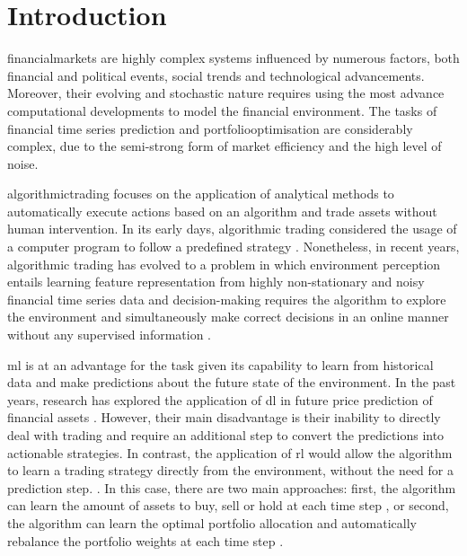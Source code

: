 \chapter{Introduction} \label{ch:introduction}

\Gls{financialmarkets} are highly complex systems influenced by numerous factors, both financial and political events, social trends and technological advancements. Moreover, their evolving and stochastic nature requires using the most advance computational developments to model the financial environment. The tasks of financial time series prediction and \Gls{portfoliooptimisation} are considerably complex, due to the semi-strong form of market efficiency and the high level of noise. \cite{Shen2020}

\Gls{algorithmictrading} focuses on the application of analytical methods to automatically execute actions based on an algorithm and trade assets without human intervention. In its early days, algorithmic trading considered the usage of a computer program to follow a predefined strategy \cite{Lei2020}. Nonetheless, in recent years, algorithmic trading has evolved to a problem in which environment perception entails learning feature representation from highly non-stationary and noisy financial time series data and decision-making requires the algorithm to explore the environment and simultaneously make correct decisions in an online manner without any supervised information \cite{Ma2021}.

\acrfull{ml} is at an advantage for the task given its capability to learn from historical data and make predictions about the future state of the environment. In the past years, research has explored the application of \acrfull{dl} in future price prediction of financial assets \cite{Shen2020,Nti2020,Wu2023,Hasan2024}. However, their main disadvantage is their inability to directly deal with trading and require an additional step to convert the predictions into actionable strategies. In contrast, the application of \acrfull{rl} would allow the algorithm to learn a trading strategy directly from the environment, without the need for a prediction step. \cite{Moody2001,Yang2020}. In this case, there are two main approaches: first, the algorithm can learn the amount of assets to buy, sell or hold at each time step \cite{Liu2018}, or second, the algorithm can learn the optimal portfolio allocation and automatically rebalance the portfolio weights at each time step \cite{Guan2021}.

